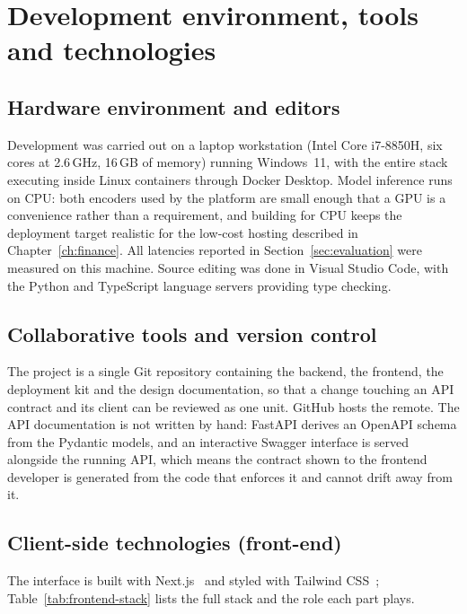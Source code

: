 \section{Development environment, tools and technologies}

\subsection{Hardware environment and editors}

Development was carried out on a laptop workstation (Intel Core i7-8850H, six
cores at 2.6\,GHz, 16\,GB of memory) running Windows~11, with the entire stack
executing inside Linux containers through Docker Desktop. Model inference runs
on CPU: both encoders used by the platform are small enough that a GPU is a
convenience rather than a requirement, and building for CPU keeps the deployment
target realistic for the low-cost hosting described in
Chapter~\ref{ch:finance}. All latencies reported in
Section~\ref{sec:evaluation} were measured on this machine. Source editing was
done in Visual Studio Code, with the Python and TypeScript language servers
providing type checking.

\subsection{Collaborative tools and version control}

The project is a single Git repository containing the backend, the frontend, the
deployment kit and the design documentation, so that a change touching an API
contract and its client can be reviewed as one unit. GitHub hosts the remote. The
API documentation is not written by hand: FastAPI derives an OpenAPI schema from
the Pydantic models, and an interactive Swagger interface is served alongside the
running API, which means the contract shown to the frontend developer is
generated from the code that enforces it and cannot drift away from it.

\subsection{Client-side technologies (front-end)}

The interface is built with Next.js~\cite{nextjs} and styled with Tailwind
CSS~\cite{tailwind}; Table~\ref{tab:frontend-stack} lists the full stack and the
role each part plays.

